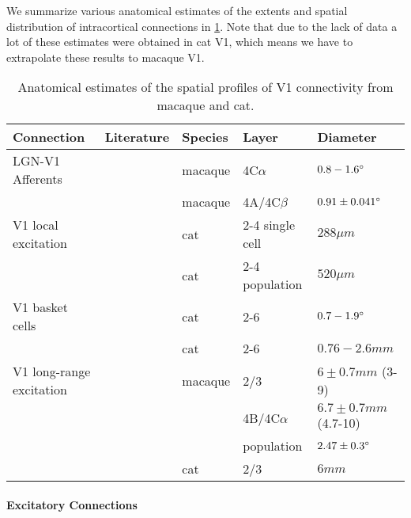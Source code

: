We summarize various anatomical estimates of the extents and spatial
distribution of intracortical connections in
\ref{anatomicaltable}. Note that due to the lack of data a lot of
these estimates were obtained in cat V1, which means we have to
extrapolate these results to macaque V1.

\begin{table}
  \centering
  \begin{adjustbox}{width=1\textwidth}
  \begin{tabular}{l | l l l l}
    Connection               & Literature            & Species & Layer & Diameter \\
    \hline
    LGN-V1 Afferents         & \cite{Angelucci2002c} & macaque & 4C$\alpha$ & $0.8-1.6\degree$ \\
                             & \cite{Angelucci2006a} & macaque & 4A/4C$\beta$ & $0.91 \pm 0.041\degree$ \\
    \hline
    V1 local excitation      & \cite{Buzas2006}      & cat      & 2-4 single cell & $288 \mu m$ \\
                             & \cite{Buzas2006}      & cat      & 2-4 population  & $520 \mu m$ \\
    \hline
    V1 basket cells          & \cite{Buzas2001}      & cat      & 2-6 & $0.7-1.9\degree$ \\
                             & \cite{Buzas2001}      & cat      & 2-6 & $0.76-2.6 mm$ \\
    \hline
    V1 long-range excitation & \cite{Angelucci2002}  & macaque  & 2/3 & $6\pm 0.7 mm$ (3-9) \\
                             &                       &          & 4B/4C$\alpha$ & $6.7 \pm 0.7 mm$ (4.7-10) \\
                             &                       &          & population & $2.47 \pm 0.3\degree$ \\
                             & \cite{Buzas2006}      & cat      & 2/3 & $6 mm$ \\
    \hline
  \end{tabular}
  \end{adjustbox}
  \caption{Anatomical estimates of the spatial profiles of V1
    connectivity from macaque and cat.}
  \label{anatomicaltable}
\end{table}


\paragraph{Excitatory Connections}

